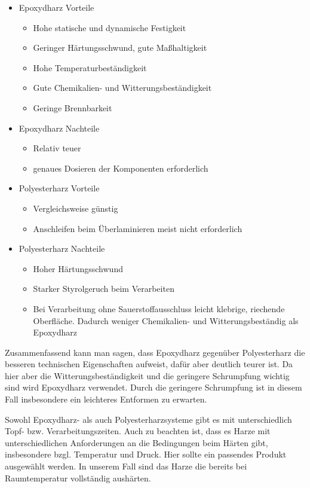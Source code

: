 \documentclass[12pt, a4paper, ngerman]{article}
\begin{document}
\begin{itemize}
	\item Epoxydharz Vorteile
	\begin{itemize}
		\item Hohe statische und dynamische Festigkeit
		\item Geringer Härtungsschwund, gute Maßhaltigkeit
		\item Hohe Temperaturbeständigkeit
		\item Gute Chemikalien- und Witterungsbeständigkeit
		\item Geringe Brennbarkeit
	\end{itemize}
	\item Epoxydharz Nachteile
	\begin{itemize}
		\item Relativ teuer
		\item genaues Dosieren der Komponenten erforderlich
	\end{itemize}
	\item Polyesterharz Vorteile	
	\begin{itemize}
		\item Vergleichsweise günstig
		\item Anschleifen beim Überlaminieren meist nicht erforderlich
	\end{itemize} 
	\item Polyesterharz Nachteile
	\begin{itemize}
		\item Hoher Härtungsschwund
		\item Starker Styrolgeruch beim Verarbeiten
		\item Bei Verarbeitung ohne Sauerstoffausschluss leicht klebrige, riechende Oberfläche. Dadurch weniger Chemikalien- und Witterungsbeständig als Epoxydharz
	\end{itemize}	 
\end{itemize}

Zusammenfassend kann man sagen, dass Epoxydharz gegenüber Polyesterharz die besseren technischen Eigenschaften aufweist, dafür aber deutlich teurer ist. Da hier aber die Witterungsbeständigkeit und die geringere Schrumpfung wichtig sind wird Epoxydharz verwendet. Durch die geringere Schrumpfung ist in diesem Fall insbesondere ein leichteres Entformen zu erwarten.

Sowohl Epoxydharz- als auch Polyesterharzsysteme gibt es mit unterschiedlich Topf- bzw. Verarbeitungszeiten. Auch zu beachten ist, dass es Harze mit unterschiedlichen Anforderungen an die Bedingungen beim Härten gibt, insbesondere bzgl. Temperatur und Druck. Hier sollte ein passendes Produkt ausgewählt werden. In unserem Fall sind das Harze die bereits bei Raumtemperatur vollständig aushärten.
\end{document}

